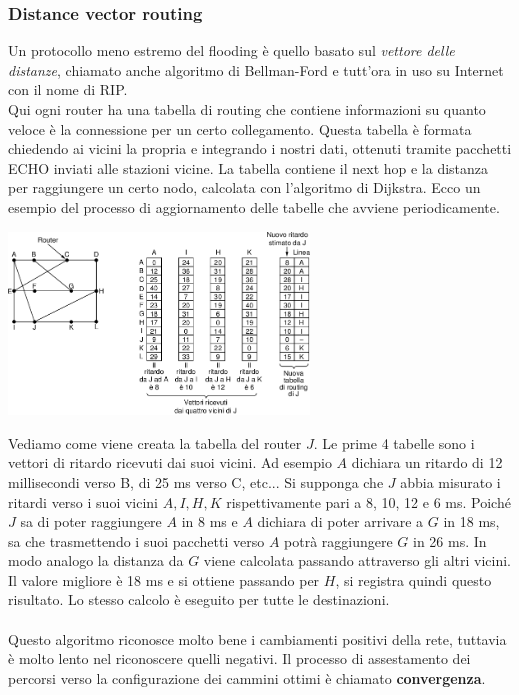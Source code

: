 \documentclass[10pt,a4paper,twoside]{article}
\begin{document}
\subsubsection{Distance vector routing}
Un protocollo meno estremo del flooding è quello basato sul \textit{vettore delle distanze}, chiamato anche algoritmo di Bellman-Ford e tutt'ora in uso su Internet con il nome di RIP.\\
Qui ogni router ha una tabella di routing che contiene informazioni su quanto veloce è la connessione per un certo collegamento. Questa tabella è formata chiedendo ai vicini la propria e integrando i nostri dati, ottenuti tramite pacchetti ECHO inviati alle stazioni vicine.
La tabella contiene il next hop e la distanza per raggiungere un certo nodo, calcolata con l'algoritmo di Dijkstra. Ecco un esempio del processo di aggiornamento delle tabelle che avviene periodicamente.
\begin{center}
\includegraphics[width=0.6\textwidth]{images/distance_vector_routing.png}
\end{center}
Vediamo come viene creata la tabella del router $J$. Le prime 4 tabelle sono i vettori di ritardo ricevuti dai suoi vicini. Ad esempio $A$ dichiara un ritardo di 12 millisecondi verso B, di 25 ms verso C, etc... Si supponga che $J$ abbia misurato i ritardi verso i suoi vicini $A, I, H, K$ rispettivamente pari a 8, 10, 12 e 6 ms. Poiché $J$ sa di poter raggiungere $A$ in 8 ms e $A$ dichiara di poter arrivare a $G$ in 18 ms, sa che trasmettendo i suoi pacchetti verso $A$ potrà raggiungere $G$ in 26 ms. In modo analogo la distanza da $G$ viene calcolata passando attraverso gli altri vicini. Il valore migliore è 18 ms e si ottiene passando per $H$, si registra quindi questo risultato. Lo stesso calcolo è eseguito per tutte le destinazioni.\\\\
Questo algoritmo riconosce molto bene i cambiamenti positivi della rete, tuttavia è molto lento nel riconoscere quelli negativi. Il processo di assestamento dei percorsi verso la configurazione dei cammini ottimi è chiamato \textbf{convergenza}.\\
\end{document}
